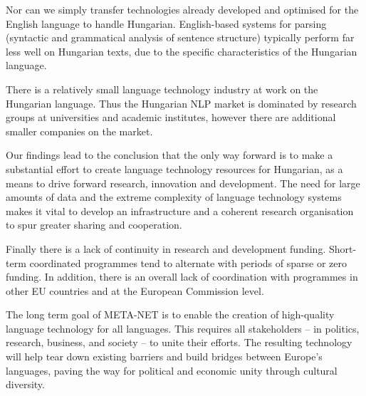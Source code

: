 \begin{multicols}{2}
  Nor can we simply transfer technologies already developed and optimised for the English language to handle Hungarian. English-based systems for parsing (syntactic and grammatical analysis of sentence structure) typically perform far less well on Hungarian texts, due to the specific characteristics of the Hungarian language.

  There is a relatively small language technology industry at work on the Hungarian language. Thus the Hungarian NLP market is dominated by research groups at universities and academic institutes, however there are additional smaller companies on the market.  

  Our findings lead to the conclusion that the only way forward is to make a substantial effort to create language technology resources for Hungarian, as a means to drive forward research, innovation and development. The need for large amounts of data and the extreme complexity of language technology systems makes it vital to develop an infrastructure and a coherent research organisation to spur greater sharing and cooperation.

  Finally there is a lack of continuity in research and development funding. Short-term coordinated programmes tend to alternate with periods of sparse or zero funding. In addition, there is an overall lack of coordination with programmes in other EU countries and at the European Commission level.

  The long term goal of META-NET is to enable the creation of high-quality language technology for all languages. This requires all stakeholders -- in politics, research, business, and society -- to unite their efforts. The resulting technology will help tear down existing barriers and build bridges between Europe’s languages, paving the way for political and economic unity through cultural diversity. 
  \end{multicols}

  \clearpage

  \label{meta-net_en}


